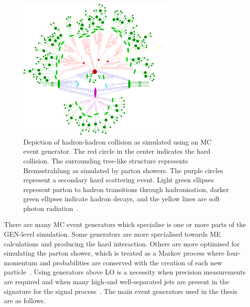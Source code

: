 \begin{figure}[ht!]
\begin{center}
    \includegraphics[width=0.7\textwidth]{images/eventGen.png}
    \caption{Depiction of hadron-hadron collision as simulated using an MC event generator. The red circle in the center indicates the hard collision. The surrounding tree-like structure represents Bremsstrahlung as simulated by parton showers. The purple circles represent a secondary hard scattering event. Light green ellipses represent parton to hadron transitions through hadronisation, darker green ellipses indicate hadron decays, and the yellow lines are soft photon radiation~\cite{Hoche:2014rga}.}
    \label{fig:MCGen}
\end{center}
\end{figure}

There are many MC event generators which specialise is one or more parts of the GEN-level simulation. Some generators are more specialised towards ME calculations and producing the hard interaction. Others are more optimised for simulating the parton shower, which is treated as a Markov process where four-momentum and probabilities are conserved with the creation of each new particle~\cite{Hoche:2014rga}.
Using generators above LO is a necessity when precision measurements are required and when many high-\pt and well-separated jets are present in the signature for the signal process~\cite{Degrande:2014sta}. The main event generators used in the thesis are as follows.

